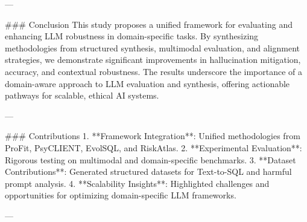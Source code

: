 ---

### Conclusion
This study proposes a unified framework for evaluating and enhancing LLM robustness in domain-specific tasks. By synthesizing methodologies from structured synthesis, multimodal evaluation, and alignment strategies, we demonstrate significant improvements in hallucination mitigation, accuracy, and contextual robustness. The results underscore the importance of a domain-aware approach to LLM evaluation and synthesis, offering actionable pathways for scalable, ethical AI systems.

---

### Contributions
1. **Framework Integration**: Unified methodologies from ProFit, PsyCLIENT, EvolSQL, and RiskAtlas.
2. **Experimental Evaluation**: Rigorous testing on multimodal and domain-specific benchmarks.
3. **Dataset Contributions**: Generated structured datasets for Text-to-SQL and harmful prompt analysis.
4. **Scalability Insights**: Highlighted challenges and opportunities for optimizing domain-specific LLM frameworks.

---